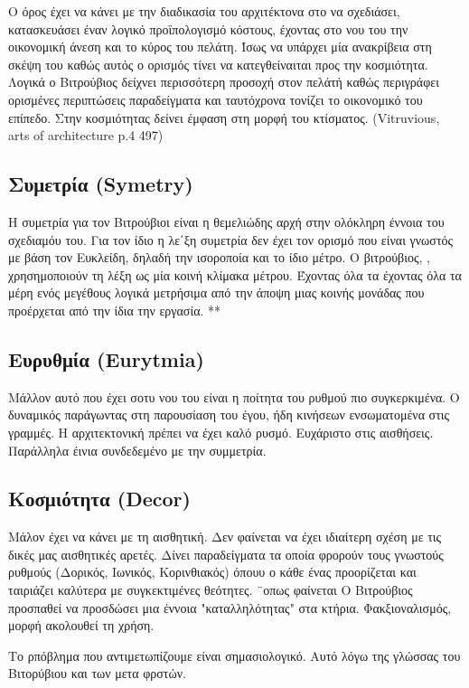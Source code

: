   Ο όρος έχει να κάνει με την διαδικασία του αρχιτέκτονα στο να σχεδιάσει, κατασκευάσει έναν λογικό προϊπολογισμό κόστους, έχοντας στο νου του την οικονομική άνεση και το κύρος του πελάτη. Ίσως να υπάρχει μία ανακρίβεια στη σκέψη του καθώς αυτός ο ορισμός τίνει να κατεγθείναιται προς την κοσμιότητα. Λογικά ο Βιτρούβιος δείχνει περισσότερη προσοχή στον πελάτή καθώς περιγράφει ορισμένες περιπτώσεις παραδείγματα και ταυτόχρονα τονίζει το οικονομικό του επίπεδο. Στην κοσμιότητας δείνει έμφαση στη μορφή του κτίσματος. (Vitruvious, arts of architecture p.4 497)
  
\subsection{Συμετρία (Symetry)}

  Η συμετρία για τον Βιτρούβιοι είναι η θεμελιώδης αρχή στην ολόκληρη έννοια του σχεδιαμόυ του. Για τον ίδιο η λε΄ξη συμετρία δεν έχει τον ορισμό που είναι γνωστός με βάση τον Ευκλείδη, δηλαδή την ισοροποία και το ίδιο μέτρο. Ο βιτρούβιος, , χρησημοποιούν τη λέξη ως μία κοινή κλίμακα μέτρου. Έχοντας όλα τα έχοντας όλα τα μέρη ενός μεγέθους λογικά μετρήσιμα από την άποψη μιας κοινής μονάδας που προέρχεται από την ίδια την εργασία. ** 
  
  \subsection{Ευρυθμία (Eurytmia)}
  
  Μάλλον αυτό που έχει σοτυ νου του είναι η ποίτητα του ρυθμού πιο συγκερκιμένα. Ο δυναμικός παράγωντας στη παρουσίαση του έγου, ήδη κινήσεων ενσωματομένα στις γραμμές. Η αρχιτεκτονική πρέπει να έχει καλό ρυσμό. Ευχάριστο στις αισθήσεις. Παράλληλα έινια συνδεδεμένο με την  συμμετρία.
  
  \subsection{Κοσμιότητα (Decor)}
  
  Μάλον έχει να κάνει με τη  αισθητική. Δεν φαίνεται να έχει ιδιαίτερη σχέση με τις δικές μας αισθητικές αρετές.
  Δίνει παραδείγματα τα οποία φρορούν τους γνωστούς ρυθμούς (Δορικός, Ιωνικός, Κορινθιακός) όπουυ ο κάθε ένας προορίζεται και ταιριάζει καλύτερα με συγκεκτιμένες θεότητες.
  ¨οπως φαίνεται Ο Βιτρούβιος προσπαθεί να προσδώσει μια έννοια "καταλληλότητας" στα κτήρια. Φακξιοναλισμός, μορφή ακολουθεί τη χρήση.
  
  Το ρπόβλημα που αντιμετωπίζουμε είναι σημασιολογικό. Αυτό λόγω της γλώσσας του Βιτορύβιου και των μετα φρστών.
